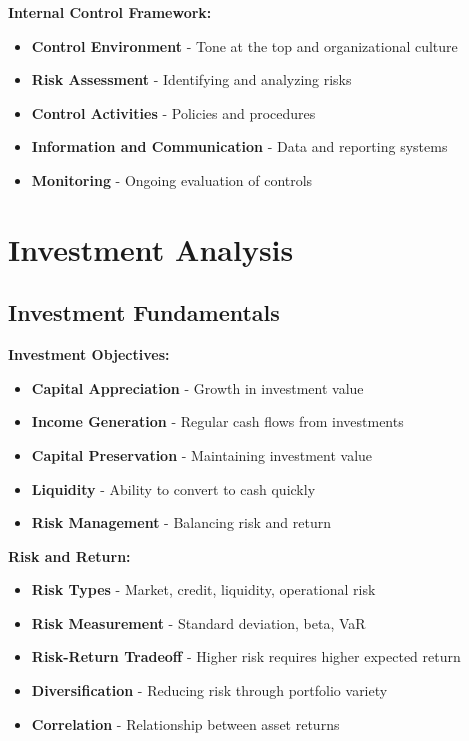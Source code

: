 \documentclass[12pt]{article}
\begin{document}
\textbf{Internal Control Framework:}
\begin{itemize}
    \item \textbf{Control Environment} - Tone at the top and organizational culture
    \item \textbf{Risk Assessment} - Identifying and analyzing risks
    \item \textbf{Control Activities} - Policies and procedures
    \item \textbf{Information and Communication} - Data and reporting systems
    \item \textbf{Monitoring} - Ongoing evaluation of controls
\end{itemize}

\section{Investment Analysis}

\subsection{Investment Fundamentals}

\textbf{Investment Objectives:}
\begin{itemize}
    \item \textbf{Capital Appreciation} - Growth in investment value
    \item \textbf{Income Generation} - Regular cash flows from investments
    \item \textbf{Capital Preservation} - Maintaining investment value
    \item \textbf{Liquidity} - Ability to convert to cash quickly
    \item \textbf{Risk Management} - Balancing risk and return
\end{itemize}

\textbf{Risk and Return:}
\begin{itemize}
    \item \textbf{Risk Types} - Market, credit, liquidity, operational risk
    \item \textbf{Risk Measurement} - Standard deviation, beta, VaR
    \item \textbf{Risk-Return Tradeoff} - Higher risk requires higher expected return
    \item \textbf{Diversification} - Reducing risk through portfolio variety
    \item \textbf{Correlation} - Relationship between asset returns
\end{itemize}
\end{document}
